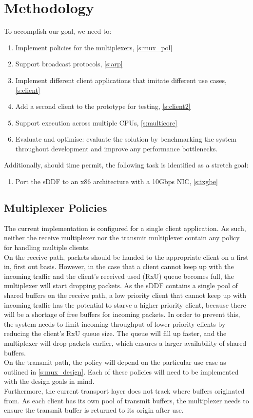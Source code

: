 \section{Methodology}
To accomplish our goal, we need to:
\begin{enumerate}
    \item Implement policies for the multiplexers, \autoref{s:mux_pol}
    \item Support broadcast protocols, \autoref{s:arp}
    \item Implement different client applications that imitate different use cases, \autoref{s:client}
    \item Add a second client to the prototype for testing, \autoref{s:client2}
    \item Support execution across multiple CPUs, \autoref{s:multicore}
    \item Evaluate and optimise: evaluate the solution by benchmarking the system throughout development 
    and improve any performance bottlenecks.
\end{enumerate}

Additionally, should time permit, the following task is identified as a stretch goal:
\begin{enumerate}
    \item Port the sDDF to an x86 architecture with a 10Gbps NIC, \autoref{s:ixgbe}
\end{enumerate}

\subsection{Multiplexer Policies} \label{s:mux_pol}
The current implementation is configured for a single client application. As such, neither the receive multiplexer
nor the transmit multiplexer contain any policy for handling multiple clients.\\
On the receive path, packets should be handed to the appropriate client on a first in, first out basis. However, 
in the case that a client cannot keep up with the incoming traffic and the client's received used (RxU) queue becomes full,
the multiplexer will start dropping packets. As the sDDF contains a single pool of shared buffers on the receive path,
a low priority client that cannot keep up with incoming traffic has the potential to starve a higher priority client, 
because there will be a shortage of free buffers for incoming packets. In order to prevent this, the system needs
to limit incoming throughput of lower priority clients by reducing the client's RxU queue size. The queue will 
fill up faster, and the multiplexer will drop packets earlier, which ensures a larger availability of shared buffers.\\
On the transmit path, the policy will depend on the particular use case as outlined in \autoref{s:mux_design}. Each of these
policies will need to be implemented with the design goals in mind.\\
Furthermore, the current transport layer does not track where buffers originated from. As each client has its own
pool of transmit buffers, the multiplexer needs to ensure the transmit buffer is returned to its origin after use.


